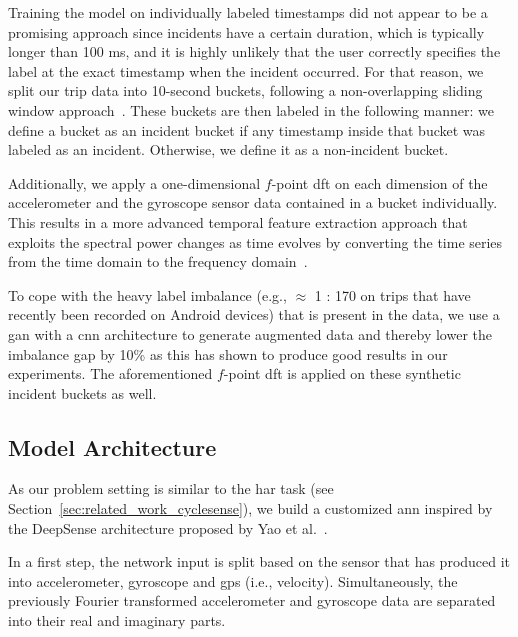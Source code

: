 Training the model on individually labeled timestamps did not appear to be a promising approach since incidents have a certain duration, which is typically longer than 100 ms, and it is highly unlikely that the user correctly specifies the label at the exact timestamp when the incident occurred.
For that reason, we split our trip data into 10-second buckets, following a non-overlapping sliding window approach~\cite{ortiz2011dynamic}.
These buckets are then labeled in the following manner: we define a bucket as an incident bucket if any timestamp inside that bucket was labeled as an incident.
Otherwise, we define it as a non-incident bucket.

Additionally, we apply a one-dimensional $f$-point \ac{dft} on each dimension of the accelerometer and the gyroscope sensor data contained in a bucket individually.
This results in a more advanced temporal feature extraction approach that exploits the spectral power changes as time evolves by converting the time series from the time domain to the frequency domain~\cite{chen2021deep}.


To cope with the heavy label imbalance (e.g., $\approx$ 1 : 170 on trips that have recently been recorded on Android devices) that is present in the data, we use a \ac{gan} with a \ac{cnn} architecture to generate augmented data and thereby lower the imbalance gap by 10\% as this has shown to produce good results in our experiments.
The aforementioned $f$-point \ac{dft} is applied on these synthetic incident buckets as well.

\subsection{Model Architecture}
\label{subsec:model_architecture}
As our problem setting is similar to the \ac{har} task (see Section~\ref{sec:related_work_cyclesense}), we build a customized \ac{ann} inspired by the DeepSense architecture proposed by Yao et al.~\cite{yao2017deepsense}.

In a first step, the network input is split based on the sensor that has produced it into accelerometer, gyroscope and \ac{gps} (i.e., velocity).
Simultaneously, the previously Fourier transformed accelerometer and gyroscope data are separated into their real and imaginary parts.

